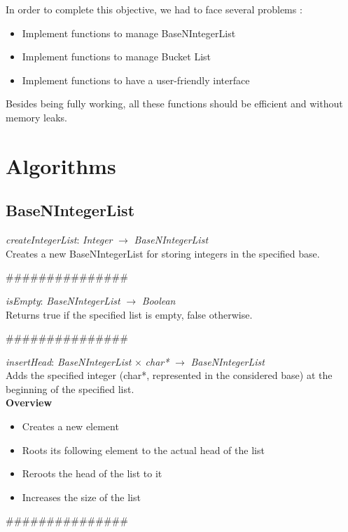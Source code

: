 \documentclass[book, backcover, english, nodocumentinfo]{upmethodology-document}
\newcommand{\nxtalgo}{\centerline{$$$$\#\#\#\#\#\#\#\#\#\#\#\#\#\#\#$$$$}}
\newcommand{\ov}{\textbf{Overview}}
\begin{document}
In order to complete this objective, we had to face several problems :
\begin{itemize}
	\item{} Implement functions to manage BaseNIntegerList
	\item{} Implement functions to manage Bucket List
	\item{} Implement functions to have a user-friendly interface
\end{itemize}

Besides being fully working, all these functions should be efficient and without memory leaks.

\chapter{Algorithms} \label{chapter:Algorithms}
	\section{BaseNIntegerList}

		\begin{minipage}{\linewidth}
			\textit{createIntegerList}: \textit{Integer} $\rightarrow$ \textit{BaseNIntegerList}\\
			Creates a new BaseNIntegerList for storing integers in the specified base.
			\label{algo:BNIL-CreateIntegerList}
			
		\end{minipage}
		\nxtalgo{}

		\begin{minipage}{\linewidth}
			\textit{isEmpty}: \textit{BaseNIntegerList} $\rightarrow$ \textit{Boolean}\\
			Returns true if the specified list is empty, false otherwise.
			\label{algo:BNIL-IsEmpty}
			
		\end{minipage}
		\nxtalgo{}

		\begin{minipage}{\linewidth}
			\textit{insertHead}: \textit{BaseNIntegerList} $\times$ \textit{char*} $\rightarrow$ \textit{BaseNIntegerList}\\
			Adds the specified integer (char*, represented in the considered base) at the beginning of the specified list.\\
			\ov
			\begin{itemize}
				\item Creates a new element
				\item Roots its following element to the actual head of the list
				\item Reroots the head of the list to it
				\item Increases the size of the list
			\end{itemize}
			\label{algo:BNIL-InsertHead}
			
		\end{minipage}
		\nxtalgo{}
\end{document}
